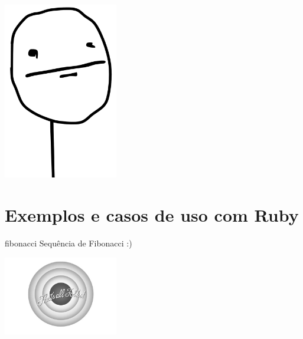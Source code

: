 \documentclass[]{beamer}
\begin{document}
  \begin{frame}{\subsecname}
    \begin{center}
      \includegraphics[width=5cm]{images/poker-face}
    \end{center}
  \end{frame}


  \backbgcolor
  \section{Exemplos e casos de uso com Ruby}

  \begin{frame}{fibonacci}
    Sequência de Fibonacci :)
  \end{frame}

  
  

  \begin{frame}{}
    \begin{center}
      \includegraphics[width=5cm]{images/isso-e-tudo}
    \end{center}
  \end{frame}
\end{document}
